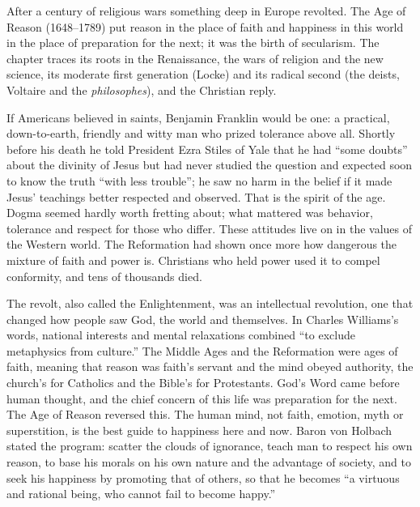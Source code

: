 
\begin{inbrief}
After a century of religious wars something deep in Europe revolted. The Age of Reason (1648--1789)
put reason in the place of faith and happiness in this world in the place of preparation for the
next; it was the birth of secularism. The chapter traces its roots in the Renaissance, the wars of
religion and the new science, its moderate first generation (Locke) and its radical second (the
deists, Voltaire and the \emph{philosophes}), and the Christian reply.
\end{inbrief}

If Americans believed in saints, Benjamin Franklin would be one: a practical, down-to-earth, friendly and witty man who prized tolerance above all. Shortly before his death he told President Ezra Stiles of Yale that he had
``some doubts'' about the divinity of Jesus but had never studied the question and expected soon to
know the truth ``with less trouble''; he saw no harm in the belief if it made Jesus' teachings better
respected and observed. That is the spirit of the age. Dogma seemed hardly worth fretting about;
what mattered was behavior, tolerance and respect for those who differ. These attitudes live on in
the values of the Western world. The Reformation had shown once more how dangerous the mixture of faith and power is. Christians who held power used it to compel conformity, and tens of thousands died.

The revolt, also called the Enlightenment, was an intellectual revolution, one that changed how people saw God, the world and themselves. In Charles Williams's words, national interests and mental relaxations
combined ``to exclude metaphysics from culture.'' The Middle Ages and the Reformation were ages of faith, meaning that reason was faith's servant and the mind obeyed authority, the church's for Catholics
and the Bible's for Protestants. God's Word came before human thought, and the chief concern of this
life was preparation for the next. The Age of Reason reversed this. The human mind, not faith,
emotion, myth or superstition, is the best guide to happiness here and now. Baron von Holbach stated
the program: scatter the clouds of ignorance, teach man to respect his own reason, to base his morals
on his own nature and the advantage of society, and to seek his happiness by promoting that of
others, so that he becomes ``a virtuous and rational being, who cannot fail to become happy.''

